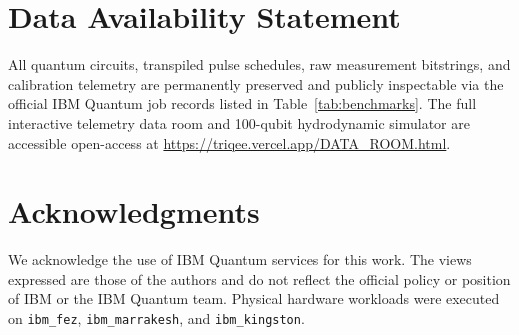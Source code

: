 \documentclass[twocolumn,secnumarabic,amssymb, nobibnotes, aps, prx, superscriptaddress]{revtex4-2}
\begin{document}
\section*{Data Availability Statement}
All quantum circuits, transpiled pulse schedules, raw measurement bitstrings, and calibration telemetry are permanently preserved and publicly inspectable via the official IBM Quantum job records listed in Table~\ref{tab:benchmarks}. The full interactive telemetry data room and 100-qubit hydrodynamic simulator are accessible open-access at \url{https://triqee.vercel.app/DATA_ROOM.html}.

\section*{Acknowledgments}
We acknowledge the use of IBM Quantum services for this work. The views expressed are those of the authors and do not reflect the official policy or position of IBM or the IBM Quantum team. Physical hardware workloads were executed on \texttt{ibm\_fez}, \texttt{ibm\_marrakesh}, and \texttt{ibm\_kingston}.


\end{document}
